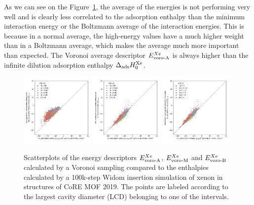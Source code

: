 \documentclass[main]{subfiles}
\begin{document}
As we can see on the Figure~\ref{fgr:compa_voro_0}, the average of the energies is not performing very well and is clearly less correlated to the adsorption enthalpy than the minimum interaction energy or the Boltzmann average of the interaction energies. This is because in a normal average, the high-energy values have a much higher weight than in a Boltzmann average, which makes the average much more important than expected. The Voronoi average descriptor $E_{\text{voro-A}}^{Xe}$ is always higher than the infinite dilution adsorption enthalpy $\Delta_{\text{ads}} H_{0}^{\text{Xe}}$. 

\begin{figure}[ht]
  \centering
    \includegraphics[width=0.32\textwidth]{figures/3-fastsim/H_Xe_0_vs_E_voro_A_overview.jpg}
    \includegraphics[width=0.32\textwidth]{figures/3-fastsim/H_Xe_0_vs_E_voro_M_overview.jpg}
    \includegraphics[width=0.32\textwidth]{figures/3-fastsim/H_Xe_0_vs_E_voro_B_overview.jpg}
    \caption{Scatterplots of the energy descriptors $E_{\text{voro-A}}^{Xe}$, $E_{\text{voro-M}}^{Xe}$ and $E_{\text{voro-B}}^{Xe}$ calculated by a Voronoi sampling compared to the enthalpies calculated by a 100k-step Widom insertion simulation of xenon in structures of CoRE MOF 2019. The points are labeled according to the largest cavity diameter (LCD) belonging to one of the intervals.}\label{fgr:compa_voro_0}
\end{figure}
\end{document}
